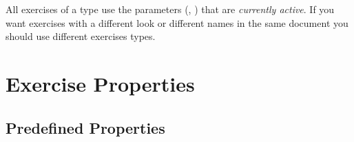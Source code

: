 \documentclass{xsim-manual}
\begin{document}
\begin{bewareofthedog}
  All exercises of a type use the parameters
  (\eg, ) that are \emph{currently active}.  If
  you want exercises with a different look or different names in the same
  document you should use different exercises types.
\end{bewareofthedog}

\section{Exercise Properties}\label{sec:exercise-properties}

\subsection{Predefined Properties}
\end{document}
